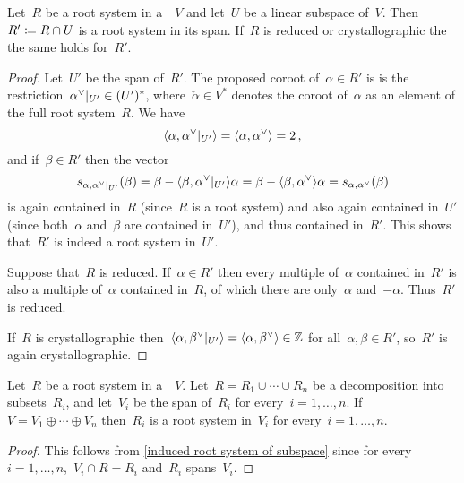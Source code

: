\begin{lemma}
  \label{induced root system of subspace}
  Let~$R$ be a root system in a~{\vectorspace{$\kf$}}~$V$ and let~$U$ be a linear subspace of~$V$.
  Then~$R' \coloneqq R \cap U$ is a root system in its span.
  If~$R$ is reduced or crystallographic the the same holds for~$R'$.
\end{lemma}


\begin{proof}
  Let~$U'$ be the span of~$R'$.
  The proposed coroot of~$\alpha \in R'$ is is the restriction~$\restrict{\check{\alpha}}{U'} \in (U')^*$, where~$\check{\alpha} \in V^*$ denotes the coroot of~$\alpha$ as an element of the full root system~$R$.
  We have
  \[
    \pair{\alpha, \restrict{\check{\alpha}}{U'}}
    =
    \pair{\alpha, \check{\alpha}}
    =
    2 \,,
  \]
  and if~$\beta \in R'$ then the vector
  \[
    s_{\alpha, \restrict{\check{\alpha}}{U'}}(\beta)
    =
    \beta - \pair{\beta, \restrict{\check{\alpha}}{U'}} \alpha
    =
    \beta - \pair{\beta, \check{\alpha}} \alpha
    =
    s_{\alpha,\check{\alpha}}(\beta)
  \]
  is again contained in~$R$ (since~$R$ is a root system) and also again contained in~$U'$ (since both~$\alpha$ and~$\beta$ are contained in~$U'$), and thus contained in~$R'$.
  This shows that~$R'$ is indeed a root system in~$U'$.
  
  Suppose that~$R$ is reduced.
  If~$\alpha \in R'$ then every multiple of~$\alpha$ contained in~$R'$ is also a multiple of~$\alpha$ contained in~$R$, of which there are only~$\alpha$ and~$-\alpha$.
  Thus~$R'$ is reduced.
  
  If~$R$ is crystallographic then~$\pair{\alpha, \restrict{\check{\beta}}{U'}} = \pair{\alpha, \check{\beta}} \in \Integer$ for all~$\alpha, \beta \in R'$, so~$R'$ is again crystallographic.
\end{proof}


\begin{corollary}
  \label{decomposition of root systems}
  Let~$R$ be a root system in a~{\vectorspace{$\kf$}}~$V$.
  Let~$R = R_1 \cup \dotsb \cup R_n$ be a decomposition into subsets~$R_i$, and let~$V_i$ be the span of~$R_i$ for every~$i = 1, \dotsc, n$.
  If~$V = V_1 \oplus \dotsb \oplus V_n$ then~$R_i$ is a root system in~$V_i$ for every~$i = 1, \dotsc, n$.
\end{corollary}


\begin{proof}
  This follows from \cref{induced root system of subspace} since for every~$i = 1, \dotsc, n$,~$V_i \cap R = R_i$ and~$R_i$ spans~$V_i$.
\end{proof}


